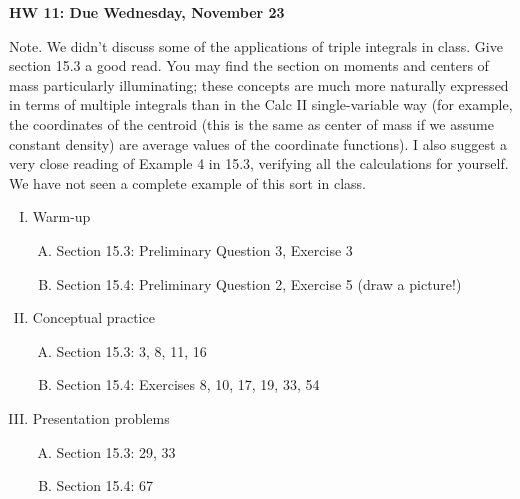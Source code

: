 \documentclass[10pt]{amsart}
\begin{document}
\begin{center}
\textbf{HW 11: Due Wednesday, November 23}
\end{center}
Note. We didn't discuss some of the applications of triple integrals in class. Give section 15.3 a good read. You may find the section on moments and centers of mass particularly illuminating; these concepts are much more naturally expressed in terms of multiple integrals than in the Calc II single-variable way (for example, the coordinates of the centroid (this is the same as center of mass if we assume constant density) are average values of the coordinate functions). I also suggest a very close reading of Example 4 in 15.3, verifying all the calculations for yourself. We have not seen a complete example of this sort in class.
\begin{enumerate}[I.]
    \item Warm-up
    \begin{enumerate}[A.]
        \item Section 15.3: Preliminary Question 3, Exercise 3
        \item Section 15.4: Preliminary Question 2, Exercise 5 (draw a picture!)
    \end{enumerate}
    \item Conceptual practice
    \begin{enumerate}[A.]
        \item Section 15.3: 3, 8, 11, 16
        \item Section 15.4: Exercises 8, 10, 17, 19, 33, 54
    \end{enumerate}
    \item Presentation problems
    \begin{enumerate}[A.]
        \item Section 15.3: 29, 33
        \item Section 15.4: 67
    \end{enumerate}
\end{enumerate}
\end{document}
